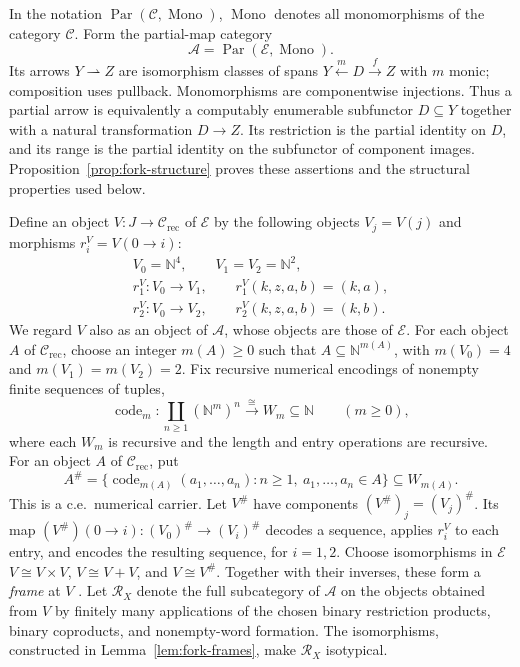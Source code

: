 \documentclass[11pt]{article}
\newcommand{\N}{\mathbb N}
\begin{document}
In the notation $\operatorname{Par}(\mathcal C,\operatorname{Mono})$,
$\operatorname{Mono}$ denotes all monomorphisms of the category
$\mathcal C$. Form the partial-map category
\[
 \mathcal A=\operatorname{Par}(\mathcal E,\operatorname{Mono}).
\]
Its arrows $Y\rightharpoonup Z$ are isomorphism classes of spans
$Y\xleftarrow{m}D\xrightarrow{f}Z$ with $m$ monic; composition
uses pullback. Monomorphisms are componentwise injections.
Thus a partial arrow is equivalently a computably enumerable
subfunctor $D\subseteq Y$ together with a natural transformation
$D\to Z$. Its restriction is the partial identity on $D$, and its range is the
partial identity on the subfunctor of component images.
Proposition~\ref{prop:fork-structure} proves these assertions and
the structural properties used below.

Define an object $V:J\to\mathcal C_{\mathrm{rec}}$ of $\mathcal E$
by the following objects $V_j=V(j)$ and morphisms
$r_i^V=V(0\to i)$:
\begin{equation}\label{eq:universal-fork}
 \begin{gathered}
 V_0=\N^4,\qquad V_1=V_2=\N^2,\\
 r_1^V:V_0\to V_1,\qquad r_1^V(k,z,a,b)=(k,a),\\
 r_2^V:V_0\to V_2,\qquad r_2^V(k,z,a,b)=(k,b).
 \end{gathered}
\end{equation}
We regard $V$ also as an object of $\mathcal A$, whose objects
are those of $\mathcal E$.
For each object $A$ of $\mathcal C_{\mathrm{rec}}$, choose an integer
$m(A)\ge0$ such that $A\subseteq\N^{m(A)}$, with
$m(V_0)=4$ and $m(V_1)=m(V_2)=2$.
Fix recursive numerical encodings of nonempty finite sequences of tuples,
\[
 \operatorname{code}_m:
 \coprod_{n\ge1}(\N^m)^n\xrightarrow{\cong}W_m\subseteq\N
 \qquad(m\ge0),
\]
where each $W_m$ is recursive and the length and entry operations
are recursive. For an object $A$ of $\mathcal C_{\mathrm{rec}}$, put
\[
 A^\#=\{\operatorname{code}_{m(A)}(a_1,\ldots,a_n):
                 n\ge1,\ a_1,\ldots,a_n\in A\}\subseteq W_{m(A)}.
\]
This is a c.e.\ numerical carrier. Let $V^\#$ have components
$(V^\#)_j=(V_j)^\#$.
Its map $(V^\#)(0\to i):(V_0)^\#\to(V_i)^\#$ decodes a sequence,
applies $r_i^V$ to each entry, and encodes the resulting sequence,
for $i=1,2$.
Choose isomorphisms in $\mathcal E$
$V\cong V\times V$, $V\cong V+V$, and $V\cong V^\#$.
Together with their inverses, these form a \emph{frame} at $V$
\cite[Section 3]{Heller}.
Let $\mathscr R_X$ denote the full subcategory of $\mathcal A$
on the objects obtained from $V$ by finitely many applications of
the chosen binary restriction products, binary coproducts, and
nonempty-word formation.
The isomorphisms, constructed in Lemma~\ref{lem:fork-frames}, make
$\mathscr R_X$ isotypical.
\end{document}
